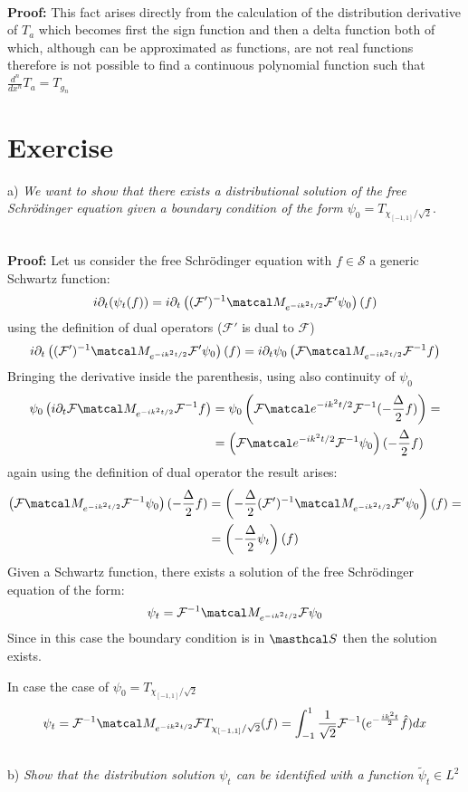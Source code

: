 \documentclass{article}
\newcommand{\ex}{\textit}
\newcommand{\proof}{\\ \textbf{Proof: }}
\newcommand{\F}{\mathcal F}
\begin{document}
\proof This fact arises directly from the calculation of the distribution derivative of $T_a$ which becomes first the sign function and then a delta function both of which, although can be approximated as functions, are not real functions therefore is not possible to find a continuous polynomial function such that $\frac{d^n}{dx^n}T_a = T_{g_n}$

\section{Exercise}
a) \ex{We want to show that there exists a distributional solution of the free Schrödinger equation given a boundary condition of the form $\psi_0 = T_{\chi_{[-1, 1]}/\sqrt 2}$}.

\proof Let us consider the free Schrödinger equation with $f \in \mathcal S$ a generic Schwartz function:
\[
    i \partial_t (\psi_t (f)) = i \partial_t \left( (\F')^{-1}\matcal M_{e^{-ik^2 t / 2}} \F' \psi_0 \right) (f) 
\]
using the definition of dual operators ($\F'$ is dual to $\F$)
\[
     i \partial_t \left( (\F')^{-1}\matcal M_{e^{-ik^2 t / 2}} \F' \psi_0 \right) (f) =  i \partial_t \psi_0\left( \F\matcal M_{e^{-ik^2 t / 2}} \F^{-1} f \right)
\]
Bringing the derivative inside the parenthesis, using also continuity of $\psi_0$
\[
    \begin{split}
        \psi_0\left( i \partial_t \F\matcal M_{e^{-ik^2 t / 2}} \F^{-1} f \right) &= \psi_0\left(\F\matcal e^{-ik^2 t / 2} \F^{-1} (-\frac{\Delta}{2}f) \right) = \\
        & = \left(\F\matcal e^{-ik^2 t / 2} \F^{-1}\psi_0  \right) (-\frac{\Delta}{2}f)
    \end{split}
\]
again using the definition of dual operator the result arises:
\[
    \begin{split}
        \left( \F \matcal M_{e^{-ik^2 t / 2}} \F^{-1}\psi_0  \right) (-\frac{\Delta}{2}f) &= \left( -\frac{\Delta}{2} (\F')^{-1} \matcal M_{e^{-ik^2 t / 2}} \F' \psi_0  \right) (f) = \\
        & = \left( -\frac{\Delta}{2} \psi_t \right) (f)
    \end{split}
\]
Given a Schwartz function, there exists a solution of the free Schrödinger equation of the form:
\[
    \psi_t = \F^{-1} \matcal M_{e^{-ik^2 t / 2}} \F \psi_0
\]
Since in this case the boundary condition is in $\masthcal S$ then the solution exists.

In case the case of $\psi_0 = T_{\chi_{[-1, 1]}/\sqrt 2}$
\[
     \psi_t = \F^{-1} \matcal M_{e^{-ik^2 t / 2}} \F T_{\chi_{[-1, 1]}/\sqrt 2}(f) = \int_{-1}^1 \frac{1}{\sqrt 2} \F^{-1} (e^{-\frac{ik^2t}{2}} \hat f ) dx
\]
\\
b) \ex{ Show that the distribution solution $\psi_t$ can be identified with a function $\tilde\psi_t \in L^2$}
\end{document}
